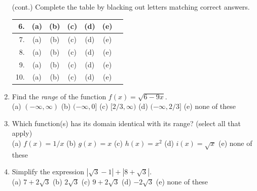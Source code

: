\documentclass[fleqn,12pt]{article}
\newcommand{\<}{\ensuremath{\langle}}
\renewcommand{\>}{\ensuremath{\rangle}}
\begin{document}
\begin{enumerate}[label={\bf \arabic*.}]

\newpage
 (cont.)
Complete the table by blacking out letters matching correct answers.

  \begin{center}
    \begin{tabular}{|r|c|c|c|c|c|c|}
      \hline
      6. & (a) & (b) & (c) & (d) & (e) \\[4pt]
      \hline
      7. & (a) & (b) & (c) & (d) & (e)\\[4pt]
      \hline
      8. & (a) & (b) & (c) & (d) & (e)\\[4pt]
      \hline
      9. & (a) & (b) & (c) & (d) & (e) \\[4pt]
      \hline
      10. & (a) & (b) & (c) & (d) & (e) \\[4pt]
      \hline
    \end{tabular}
  \end{center}


    \item
      Find the \emph{range} of the function $f(x) = \sqrt{6 - 9x}$.\\[6pt]
      (a) $(-\infty, \infty)$\hfill
      (b) $(-\infty, 0]$\hfill
      (c) $[2/3,\infty)$\hfill
      (d) $(-\infty, 2/3]$\hfill
      (e) none of these %

    \probskip

  \item Which function(s) has its domain identical with its range?
    (select all that apply)\\[6pt]
    (a) $f(x) = 1/x$
    \hfill (b) $g(x) = x$
    \hfill (c)  $h(x) = x^2$
    \hfill (d)  $i(x) = \sqrt{x}$
    \hfill (e) none of these

    \probskip

  \item Simplify the expression $|\sqrt{3} - 1| + |8 + \sqrt{3}|$.
    \\[6pt]
    (a) $7+2\sqrt{3}$\hfill 
    (b) $2\sqrt{3}$\hfill 
    (c) $9+2\sqrt{3}$\hfill 
    (d) $-2\sqrt{3}$\hfill 
    (e) none of these

    \probskip



\end{enumerate}
\end{document}
